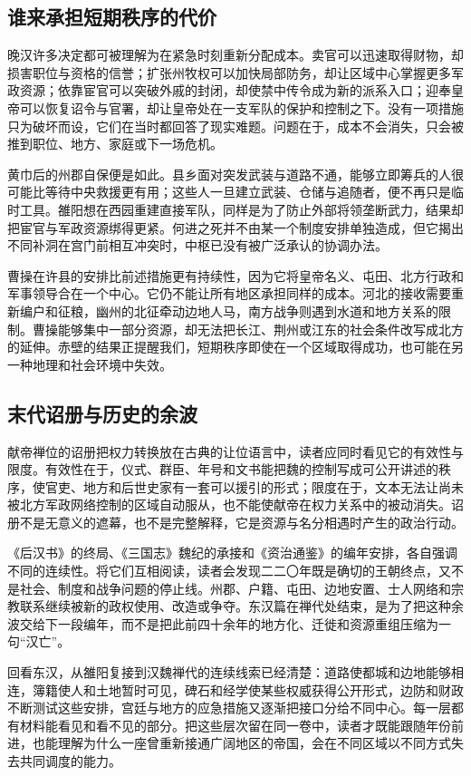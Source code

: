 \subsection{谁来承担短期秩序的代价}

晚汉许多决定都可被理解为在紧急时刻重新分配成本。卖官可以迅速取得财物，却损害职位与资格的信誉；扩张州牧权可以加快局部防务，却让区域中心掌握更多军政资源；依靠宦官可以突破外戚的封闭，却使禁中传令成为新的派系入口；迎奉皇帝可以恢复诏令与官署，却让皇帝处在一支军队的保护和控制之下。没有一项措施只为破坏而设，它们在当时都回答了现实难题。问题在于，成本不会消失，只会被推到职位、地方、家庭或下一场危机。

黄巾后的州郡自保便是如此。县乡面对突发武装与道路不通，能够立即筹兵的人很可能比等待中央救援更有用；这些人一旦建立武装、仓储与追随者，便不再只是临时工具。雒阳想在西园重建直接军队，同样是为了防止外部将领垄断武力，结果却把宦官与军政资源绑得更紧。何进之死并不由某一个制度安排单独造成，但它揭出不同补洞在宫门前相互冲突时，中枢已没有被广泛承认的协调办法。

曹操在许县的安排比前述措施更有持续性，因为它将皇帝名义、屯田、北方行政和军事领导合在一个中心。它仍不能让所有地区承担同样的成本。河北的接收需要重新编户和征粮，幽州的北征牵动边地人马，南方战争则遇到水道和地方关系的限制。曹操能够集中一部分资源，却无法把长江、荆州或江东的社会条件改写成北方的延伸。赤壁的结果正提醒我们，短期秩序即使在一个区域取得成功，也可能在另一种地理和社会环境中失效。

\subsection{末代诏册与历史的余波}

献帝禅位的诏册把权力转换放在古典的让位语言中，读者应同时看见它的有效性与限度。有效性在于，仪式、群臣、年号和文书能把魏的控制写成可公开讲述的秩序，使官吏、地方和后世史家有一套可以援引的形式；限度在于，文本无法让尚未被北方军政网络控制的区域自动服从，也不能使献帝在权力关系中的被动消失。诏册不是无意义的遮幕，也不是完整解释，它是资源与名分相遇时产生的政治行动。

《后汉书》的终局、《三国志》魏纪的承接和《资治通鉴》的编年安排，各自强调不同的连续性。将它们互相阅读，读者会发现二二〇年既是确切的王朝终点，又不是社会、制度和战争问题的停止线。州郡、户籍、屯田、边地安置、士人网络和宗教联系继续被新的政权使用、改造或争夺。东汉篇在禅代处结束，是为了把这种余波交给下一段编年，而不是把此前四十余年的地方化、迁徙和资源重组压缩为一句“汉亡”。

回看东汉，从雒阳复接到汉魏禅代的连续线索已经清楚：道路使都城和边地能够相连，簿籍使人和土地暂时可见，碑石和经学使某些权威获得公开形式，边防和财政不断测试这些安排，宫廷与地方的应急措施又逐渐把接口分给不同中心。每一层都有材料能看见和看不见的部分。把这些层次留在同一卷中，读者才既能跟随年份前进，也能理解为什么一座曾重新接通广阔地区的帝国，会在不同区域以不同方式失去共同调度的能力。

